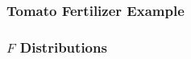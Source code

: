\documentclass[handout]{beamer}
\newcommand{\blue}[1]{\textcolor{blue2}{#1}}
\begin{document}
\begin{frame}
\frametitle{Tomato Fertilizer Example}

%
%

\end{frame}


\begin{frame}
\frametitle{$F$ Distributions}
%
%
 
\end{frame}
\end{document}
